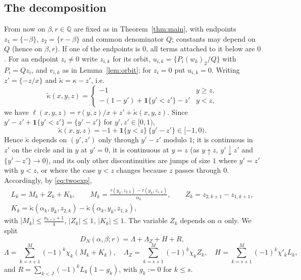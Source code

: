 \documentclass[11pt]{amsart}
\theoremstyle{definition}
\numberwithin{equation}{section}
\newcommand{\Q}{\mathbb{Q}}
\newcommand{\fr}[1]{\{#1\}}
\newcommand{\ind}{\mathbf{1}}
\begin{document}
\subsection{The decomposition}
From now on $\beta,r\in\Q$ are fixed as in Theorem~\ref{thm:main}, with endpoints $z_1=\fr{-\beta}$, $z_2=\fr{r-\beta}$ and common denominator $Q$;
constants may depend on $Q$ (hence on $\beta,r$). If one of the endpoints is $0$, all terms attached to it below are $0$. For an endpoint $z_i\ne0$
write $z_{i,k}$ for its orbit, $u_{i,k}=\fr{P_i(w_k)_2/Q}$ with $P_i=Qz_i$, and $v_{i,k}$ as in Lemma~\ref{lem:orbit}; for $z_i=0$ put $u_{i,k}=0$.
Writing $z'=\fr{-z/x}$ and $\tilde\kappa=\kappa-z'$, i.e.
\[
\tilde\kappa(x,y,z)=\begin{cases}-1 & y\ge z,\\ -(1-y')+\ind\{y'<z'\}-z' & y<z,\end{cases}
\]
we have $\ell(x,y,z)=\tau(y,z)/x+z'+\tilde\kappa(x,y,z)$. Since $y'-z'+\ind\{y'<z'\}=\fr{y'-z'}$ for $y',z'\in[0,1)$,
\begin{equation}\label{eq:kappaid}
\tilde\kappa(x,y,z)=-1+\ind\{y<z\}\,\fr{y'-z'}\in[-1,0).
\end{equation}
Hence $\tilde\kappa$ depends on $(y',z')$ only through $y'-z'$ modulo $1$; it is continuous in $z'$ on the circle and in $y$ at $y'=0$, it is continuous at
$y=z$ (as $y\uparrow z$, $y'\downarrow z'$ and $\fr{y'-z'}\to0$), and its only other discontinuities are jumps of size $1$ where $y'=z'$ with $y<z$, or where
the case $y<z$ changes because $z$ passes through $0$. Accordingly, by \eqref{eq:twoexp},
\begin{equation}\label{eq:LMZK}
\begin{gathered}
L_k=M_k+Z_k+K_k,\qquad M_k=\frac{\tau(y_k,z_{2,k})-\tau(y_k,z_{1,k})}{\alpha_k},\qquad Z_k=z_{2,k+1}-z_{1,k+1},\\
K_k=\tilde\kappa(\alpha_k,y_k,z_{2,k})-\tilde\kappa(\alpha_k,y_k,z_{1,k}),
\end{gathered}
\end{equation}
with $|M_k|\le\frac{a_{k+1}+1}4$, $|Z_k|\le1$, $|K_k|\le1$. The variable $Z_k$ depends on $\alpha$ only. We split
\begin{equation}\label{eq:decomp}
D_N(\alpha,\beta;r)=\Lambda+\Lambda_Z+H+R,
\end{equation}
\[
\Lambda=\sum_{k=s+1}^{M}(-1)^k\chi_k(M_k+K_k),\quad \Lambda_Z=\sum_{k=s+1}^{M}(-1)^k\chi_kZ_k,\quad H=\sum_{k=s+1}^{M}(-1)^k\chi'_kL_k,
\]
and $R=\sum_{k<J}(-1)^kL_k(1-g_k)$, with $g_k:=0$ for $k\le s$.
\end{document}
